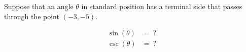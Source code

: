 Suppose that an angle $\theta$ in standard position has a terminal side that passes through the point $(-3, -5)$.

$$
\begin{align*}
  \sin(\theta) &=\ ? \\
  \csc(\theta) &=\ ?
\end{align*}
$$
